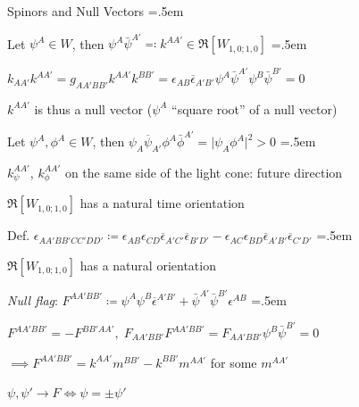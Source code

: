 \documentclass[xcolor={dvipsnames}]{beamer}
\newcommand{\magsq}[1]{\big|#1\big|^2}
\let\olditemize=\itemize
\let\endolditemize=\enditemize
\renewenvironment{itemize}{\olditemize \itemsep=.5em }{\endolditemize}
\begin{document}
\begin{frame}{Spinors and Null Vectors}
    \begin{itemize}
        \item<2-> Let $\psi^A \in W$, then $\psi^A\bar{\psi}^{A'} \eqqcolon k^{AA'} \in \Re[W_{1,0;1,0}]$
        \begin{itemize}
            \item<3-> $k_{AA'}k^{AA'} = g_{AA'BB'}k^{AA'}k^{BB'} = \epsilon_{AB}\overline{\epsilon}_{A'B'}\psi^{A}\bar{\psi}^{A'}\psi^{B}\bar{\psi}^{B'} = 0$
            \item<4-> $k^{AA'}$ is thus a null vector ($\psi^A$ ``square root'' of a null vector\textinterrobang) 
        \end{itemize}
        \item<5-> Let $\psi^A, \phi^A \in W$, then $\psi_A\overline{\psi}_{A'}\phi^{A}\bar{\phi}^{A'} = \magsq{\psi_A\phi^A} > 0$
        \begin{itemize}
            \item<6-> $k_\psi^{AA'}$, $k_\phi^{AA'}$ on the same side of the light cone: future direction
            \item<7-> $\Re[W_{1,0;1,0}]$ has a natural time orientation
        \end{itemize}
        \item<8-> Def. $\epsilon_{AA'BB'CC'DD'} \coloneqq \epsilon_{AB}\epsilon_{CD}\overline{\epsilon}_{A'C'}\overline{\epsilon}_{B'D'} - \epsilon_{AC}\epsilon_{BD}\overline{\epsilon}_{A'B'}\overline{\epsilon}_{C'D'}$
        \begin{itemize}
            \item<9-> $\Re[W_{1,0;1,0}]$ has a natural orientation
        \end{itemize}
        \item<10-> \textit{Null flag}: $F^{AA'BB'} \coloneqq \psi^A\psi^B\overline{\epsilon}^{A'B'} + \bar{\psi}^{A'}\bar{\psi}^{B'}\epsilon^{AB}$
        \begin{itemize}
            \item<11-> $F^{AA'BB'} = -F^{BB'AA'}, \; F_{AA'BB'}F^{AA'BB'} = F_{AA'BB'}\psi^{B}\bar{\psi}^{B'} = 0$
            \item<12-> $\implies F^{AA'BB'} = k^{AA'}m^{BB'} - k^{BB'}m^{AA'}$ for some $m^{AA'}$
            \item<13-> $\psi, \psi' \rightarrow F \iff \psi = \pm \psi'$
        \end{itemize} 
    \end{itemize}    
\end{frame}
\end{document}
